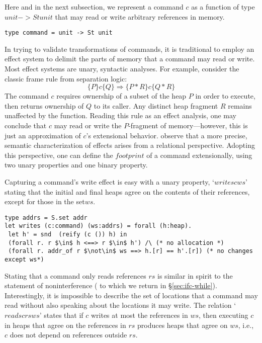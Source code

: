 \documentclass[sigplan,screen]{acmart}\settopmatter{}
\begin{document}
Here and in the next subsection,
we represent a command $c$ as a function of type \ls$unit -> St unit$
that may read or write arbitrary references in memory.
%
\begin{lstlisting}
type command = unit -> St unit
\end{lstlisting}
%
In trying to validate transformations of commands, it is traditional to
employ an effect system to delimit the parts of memory that a
command may read or write.
%
Most effect systems are unary, syntactic analyses. For example,
consider the classic frame rule from separation logic:
%
\[
\{ P \} c \{ Q \} \Rightarrow
\{ P \ast R \} c \{ Q \ast R \}
\]
The command $c$ requires ownership of a subset of the heap $P$ in
order to execute, then returns ownership of $Q$ to its
caller. Any distinct heap fragment $R$ remains unaffected by the
function. Reading this rule as an effect analysis, one may conclude
that $c$ may read or write the $P$-fragment of memory---however, this
is just an approximation of $c$'s extensional behavior.
%
\citet{benton06aplas} observe that a more precise, semantic characterization
of effects arises from a relational perspective. Adopting this
perspective, one can define the \ls$footprint$ of a command
extensionally, using two unary properties and one binary property.

Capturing a command's write effect is easy with a
unary property, `\ls$writes c ws$' stating that the initial and final
heaps agree on the contents of their references, except \iffull for \fi those
in \iffull the set\fi \ls$ws$.
%
\begin{lstlisting}
type addrs = S.set addr
let writes (c:command) (ws:addrs) = forall (h:heap).
 let h' = snd  (reify (c ()) h) in
 (forall r. r $\in$ h <==> r $\in$ h') /\ (* no allocation *)
 (forall r. addr_of r $\not\in$ ws ==> h.[r] == h'.[r]) (* no changes except ws*)
\end{lstlisting}

Stating that a command only reads references \ls$rs$ is similar in
spirit to \iffull the statement of \fi noninterference (\iffull
to which we return in \fi\S\ref{sec:ifc-while}).
Interestingly, it is impossible to describe
the set of locations that a command may read without also speaking
about the locations it may write. The relation `\ls$reads c rs ws$'
states that if \ls$c$ writes at most the references in \ls$ws$, then
executing \ls$c$ in heaps that agree on the references in \ls$rs$
produces heaps that agree on \ls$ws$, i.e., \ls$c$ does not depend on
references outside \ls$rs$.
\end{document}

